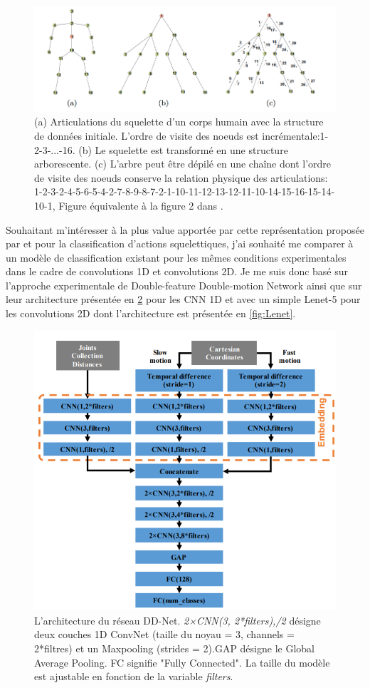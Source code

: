 \begin{figure}[H]
    \centering
    \includegraphics[width=1\linewidth]{Images/DFS.png}
    \caption{(a) Articulations du squelette d'un corps humain avec la structure de données initiale. L'ordre de visite des noeuds est incrémentale:1-2-3-...-16. (b) Le squelette est transformé en une structure arborescente. (c)  L'arbre peut être dépilé en une chaîne dont l'ordre de visite des noeuds conserve la relation physique des articulations: 1-2-3-2-4-5-6-5-4-2-7-8-9-8-7-2-1-10-11-12-13-12-11-10-14-15-16-15-14-10-1, Figure équivalente à la figure 2 dans  \cite{liu2016spatio}.}
    \label{fig:DFS}
\end{figure}

Souhaitant m'intéresser à la plus value apportée par cette représentation proposée par \cite{liu2016spatio} et \cite{2018arXiv180110304Y} pour la classification d'actions squelettiques, j'ai souhaité me comparer à un modèle de classification existant pour les mêmes conditions experimentales dans le cadre de convolutions 1D et convolutions 2D. Je me suis donc basé sur l'approche experimentale de Double-feature Double-motion Network \cite{2019arXiv190709658Y} ainsi que sur leur architecture présentée en \ref{fig:DDnet} pour les CNN 1D et avec un simple Lenet-5 \cite{lecun1998gradient} pour les convolutions 2D dont l'architecture est présentée en \ref{fig:Lenet}.


\begin{figure}[H]
    \centering
    \includegraphics[width=0.55\linewidth]{Images/ddnet.png}
    \caption{L'architecture du réseau DD-Net. \textit{2×CNN(3,
2*filters),/2} désigne deux couches 1D ConvNet (taille du noyau
= 3, channels = 2*filtres) et un Maxpooling (strides = 2).GAP
désigne le Global Average Pooling. FC signifie "Fully Connected". La taille du modèle est ajustable en fonction de la variable \textit{filters}.}
    \label{fig:DDnet}
\end{figure}

